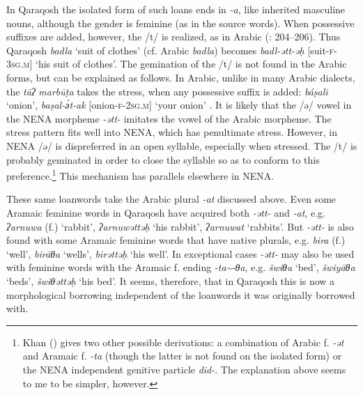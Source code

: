 \documentclass[output=paper]{langsci/langscibook}
\begin{document}
In  Qaraqosh the isolated form of such loans ends in \textit{{}-a}, like inherited masculine nouns, although the {gender} is feminine (as in the source words). When possessive suffixes are added, however, the /t/ is realized, as in Arabic (\citealt{Khan2002}: 204–206). Thus Qaraqosh \textit{badla} ‘suit of clothes’ (cf.  Arabic \textit{badla}) becomes \textit{badl\nobreakdash-ətt\nobreakdash-əḥ} [suit-\textsc{f-3sg.m]} ‘his suit of clothes’. The gemination of the /t/ is not found in the Arabic forms, but can be explained as follows. In  Arabic, unlike in many Arabic dialects, the \textit{tāʔ} \textit{marbūṭa} takes the {stress}, when any possessive suffix is added: \textit{báṣali} ‘onion’, \textit{baṣal\nobreakdash-ә́t\nobreakdash-ak} [onion-\textsc{f-2sg.m}] ‘your onion’ \citep[105]{Jastrow1983}. It is likely that the /ə/ vowel in the NENA morpheme \textit{{}-ətt-} imitates the vowel of the Arabic morpheme. The {stress} pattern fits well into NENA, which has penultimate {stress}. However, in NENA /ə/ is dispreferred in an open syllable, especially when stressed. The /t/ is probably geminated in order to close the syllable so as to conform to this preference.\footnote{Khan (\citeyear[206]{Khan2002}) gives two other possible derivations: a combination of Arabic f. \textit{\nobreakdash-ət} and Aramaic f. \textit{\nobreakdash-ta} (though the latter is not found on the isolated form) or the NENA independent genitive particle \textit{did-}. The explanation above seems to me to be simpler, however.} This mechanism has parallels elsewhere in NENA.

These same {loanwords} take the Arabic plural \textit{{}-at} discussed above. Even some Aramaic feminine words in  Qaraqosh have acquired both \textit{{}-ətt-} and \textit{\nobreakdash-at}, e.g. \textit{ʔarnuwa} (f.) ‘rabbit’, \textit{ʔarnuwəttəḥ} ‘his rabbit’, \textit{ʔarnuwat} ‘rabbits’. But \textit{{}-ətt-} is also found with some Aramaic feminine words that have native plurals, e.g. \textit{bira} (f.) ‘well’, \textit{birāθa} ‘wells’, \textit{birəttəḥ} ‘his well’. In exceptional cases \textit{{}-ətt-} may also be used with feminine words with the Aramaic f. ending \textit{{}-ta{\textasciitilde}-θa}, e.g. \textit{šwiθa} ‘bed’, \textit{šwiyāθa} ‘beds’, \textit{šwiθəttəḥ} ‘his bed’. It seems, therefore, that in Qaraqosh this is now a morphological borrowing independent of the {loanwords} it was originally borrowed with.
\end{document}
